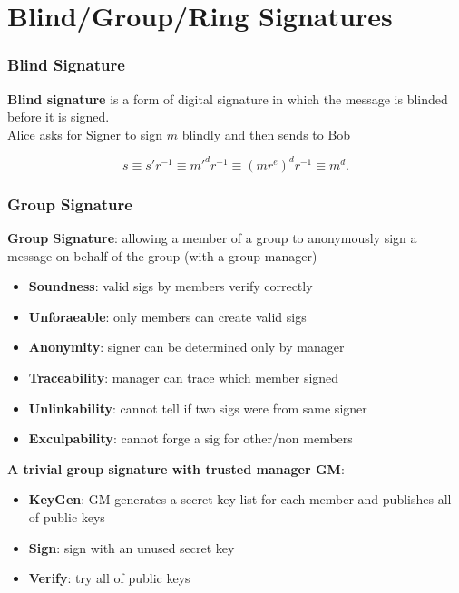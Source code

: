 \section{Blind/Group/Ring Signatures}
\begin{frame}\frametitle{Blind Signature}
\textbf{Blind signature} is a form of digital signature in which the message is blinded before it is signed.\\
Alice asks for Signer to sign $m$ blindly and then sends to Bob
\begin{figure}
\begin{center}

\end{center}
\end{figure}
\[s \equiv s'r^{-1} \equiv m'^dr^{-1} \equiv (mr^e)^dr^{-1} \equiv m^d.\]
\end{frame}
\begin{frame}\frametitle{Group Signature}
\textbf{Group Signature}: allowing a member of a group to anonymously sign a message on behalf of the group (with a group manager)
\begin{itemize}
\item \textbf{Soundness}: valid sigs by members verify correctly
\item \textbf{Unforaeable}: only members can create valid sigs
\item \textbf{Anonymity}: signer can be determined only by manager
\item \textbf{Traceability}: manager can trace which member signed
\item \textbf{Unlinkability}: cannot tell if two sigs were from same signer
\item \textbf{Exculpability}: cannot forge a sig for other/non members
\end{itemize}
\textbf{A trivial group signature with trusted manager GM}:\\
\begin{itemize}
\item \textbf{KeyGen}: GM generates a secret key list for each member and publishes all of public keys
\item \textbf{Sign}: sign with an unused secret key
\item \textbf{Verify}: try all of public keys
\end{itemize}
\end{frame}
